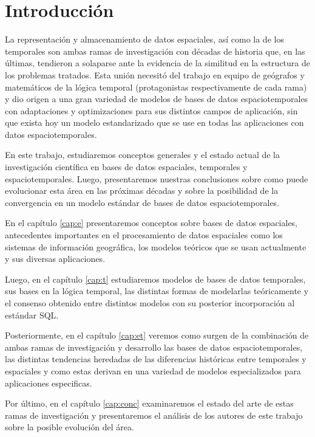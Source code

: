\chapter{Introducción} \label{cap:intro}

La representación y almacenamiento de datos espaciales, así como la de los temporales son ambas ramas de investigación con décadas de historia que, en las últimas, tendieron a solaparse ante la evidencia de la similitud en la estructura de los problemas tratados. Esta unión necesitó del trabajo en equipo de geógrafos y matemáticos de la lógica temporal (protagonistas respectivamente de cada rama) y dio origen a una gran variedad de modelos de bases de datos espaciotemporales con adaptaciones y optimizaciones para sus distintos campos de aplicación, sin que exista hoy un modelo estandarizado que se use en todas las aplicaciones con datos espaciotemporales.

En este trabajo, estudiaremos conceptos generales y el estado actual de la investigación científica en bases de datos espaciales, temporales y espaciotemporales. Luego, presentaremos nuestras conclusiones sobre como puede evolucionar esta área en las próximas décadas y sobre la posibilidad de la convergencia en un modelo estándar de bases de datos espaciotemporales.

En el capítulo \ref{cap:e} presentaremos conceptos sobre bases de datos espaciales, antecedentes importantes en el procesamiento de datos espaciales como los sistemas de información geográfica, los modelos teóricos que se usan actualmente y sus diversas aplicaciones.

Luego, en el capítulo \ref{cap:t} estudiaremos modelos de bases de datos temporales, sus bases en la lógica temporal, las distintas formas de modelarlas teóricamente y el consenso obtenido entre distintos modelos con su posterior incorporación al estándar SQL.

Posteriormente, en el capítulo \ref{cap:et} veremos como surgen de la combinación de ambas ramas de investigación y desarrollo las bases de datos espaciotemporales, las distintas tendencias heredadas de las diferencias históricas entre temporales y espaciales y como estas derivan en una variedad de modelos especializados para aplicaciones especificas.

Por último, en el capítulo \ref{cap:conc} examinaremos el estado del arte de estas ramas de investigación y presentaremos el análisis de los autores de este trabajo sobre la posible evolución del área.
